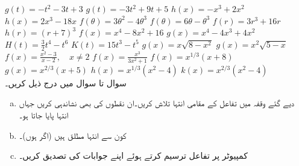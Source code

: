 $g(t)=-t^2-3t+3$
$g(t)=-3t^2+9t+5$
$h(x)=-x^3+2x^2$
$h(x)=2x^3-18x$
$f(\theta)=3\theta^2-4\theta^3$
$f(\theta)=6\theta-\theta^3$
$f(r)=3r^3+16r$
$h(r)=(r+7)^3$
$f(x)=x^4-8x^2+16$
$g(x)=x^4-4x^3+4x^2$
$H(t)=\tfrac{3}{2}t^4-t^6$
$K(t)=15t^3-t^5$
$g(x)=x\sqrt{8-x^2}$
$g(x)=x^2\sqrt{5-x}$
$f(x)=\tfrac{x^2-3}{x-2},\quad x\ne 2$
$f(x)=\tfrac{x^3}{3x^2+1}$
$f(x)=x^{1/3}(x+8)$
$g(x)=x^{2/3}(x+5)$
$h(x)=x^{1/3}(x^2-4)$
$k(x)=x^{2/3}(x^2-4)$
\\
سوال  تا سوال  میں درج ذیل کریں۔
\begin{enumerate}[a.]
\item
دیے گئے وقفہ میں تفاعل کے مقامی انتہا تلاش کریں۔ان نقطوں کی بھی نشاندہی کریں جہاں انتہا پایا جاتا ہو۔
\item
کون سے انتہا مطلق ہیں (اگر ہوں)۔
\item
کمپیوٹر پر تفاعل ترسیم کرتے ہوئے اپنے جوابات کی تصدیق کریں۔
\end{enumerate}

